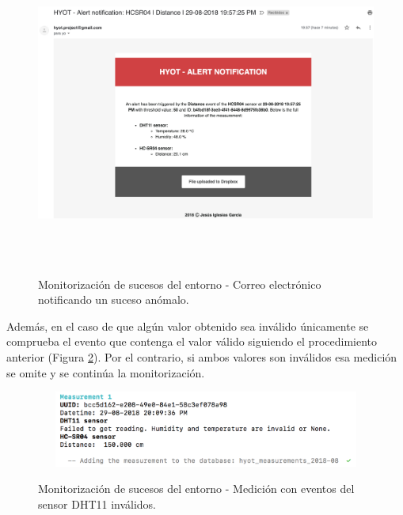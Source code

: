 \documentclass[12pt,a4paper, twoside]{report}
\begin{document}
	 		\begin{figure}[!ht]   
				\caption{Monitorización de sucesos del entorno - Correo electrónico notificando un suceso anómalo.} 
				\begin{center} 
					\includegraphics[width=17cm,height=10cm]{Images/userGuide/monitoring/mailAlert} \\
					\label{fig:userguide_monitoring_mailAlert} 
				\end{center}  
			\end{figure}	 
	
	\newpage
		 
	 Además, en el caso de que algún valor obtenido sea inválido únicamente se comprueba el evento que contenga el valor válido siguiendo el procedimiento anterior (Figura \ref{fig:userguide_monitoring_measurementInvalid}). Por el contrario, si ambos valores son inválidos esa medición se omite y se continúa la monitorización. \\
	 
	 		\begin{figure}[!ht]   
				\caption{Monitorización de sucesos del entorno - Medición con eventos del sensor DHT11 inválidos.} 
				\begin{center} 
					\includegraphics[width=12cm,height=2.5cm]{Images/userGuide/monitoring/measurementInvalid} \\
					\label{fig:userguide_monitoring_measurementInvalid} 
				\end{center}  
			\end{figure}	 
	 
\end{document}
